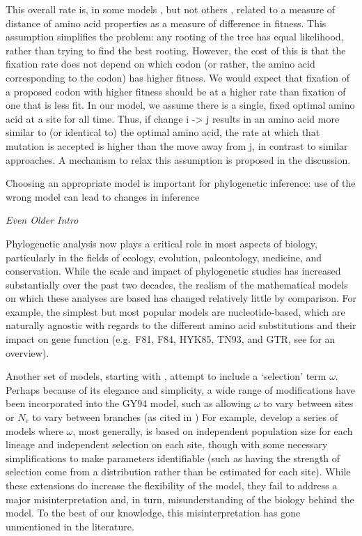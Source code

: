 \documentclass[12pt,letterpaper,fleqn]{article}
\renewcommand{\subsection}[1]{%
\bigskip
\begin{center}
\begin{large}
\normalfont\itshape #1
\end{large}
\end{center}}
\newcommand{\Ne}{\ensuremath{{N_e}}\xspace} %
\begin{document}
{This overall rate is, in some models \citep{PlaceHolderRef}, but not others \citep{PlaceHolderRef}, related to a measure of distance of amino acid properties as a measure of difference in fitness.
This assumption simplifies the problem: any rooting of the tree has equal likelihood, rather than trying to find the best rooting.
However, the cost of this is that the fixation rate does not depend on which codon (or rather, the amino acid corresponding to the codon) has higher fitness.
We would expect that fixation of a proposed codon with higher fitness should be at a higher rate than fixation of one that is less fit.
In our model, we assume there is a single, fixed optimal amino acid at a site for all time.
Thus, if change i -> j results in an amino acid more similar to (or identical to) the optimal amino acid, the rate at which that mutation is accepted is higher than the move away from j, in contrast to similar approaches.
A mechanism to relax this assumption is proposed in the discussion.

Choosing an appropriate model is important for phylogenetic inference: use of the wrong model can lead to changes in inference


\pagebreak
\subsection{Even Older Intro}
Phylogenetic analysis now plays a critical role in most aspects of biology, particularly in the fields of ecology, evolution, paleontology, medicine, and conservation.
While the scale and impact of phylogenetic studies has increased substantially over the past two decades, the realism of the mathematical models on which these analyses are based has changed relatively little by comparison.
For example, the simplest but most popular models are nucleotide-based, which are naturally agnostic with regards to the different amino acid substitutions and their impact on gene function (e.g.~F81, F84, HYK85, TN93, and GTR, see \citet{Yang2014} for an overview).

Another set of models, starting with \citep[][commonly represented as GY94]{GoldmanAndYang1994}, attempt to include a `selection' term $\omega$.
Perhaps because of its elegance and simplicity, a wide range of modifications have been incorporated into the GY94 model, such as allowing $\omega$ to vary between sites or \Ne to vary between branches (as cited in \citet{Anisimova2012})
For example, \citet{NielsenAndYang2003} develop a series of models where $\omega$, most generally, is based on independent population size for each lineage and independent selection on each site, though with some necessary simplifications to make parameters identifiable (such as having the strength of selection come from a distribution rather than be estimated for each site).
While these extensions do increase the flexibility of the model, they fail to address a major misinterpretation and, in turn, misunderstanding of the biology behind the model.
To the best of our knowledge, this misinterpretation has gone unmentioned in the literature.

}
\end{document}
